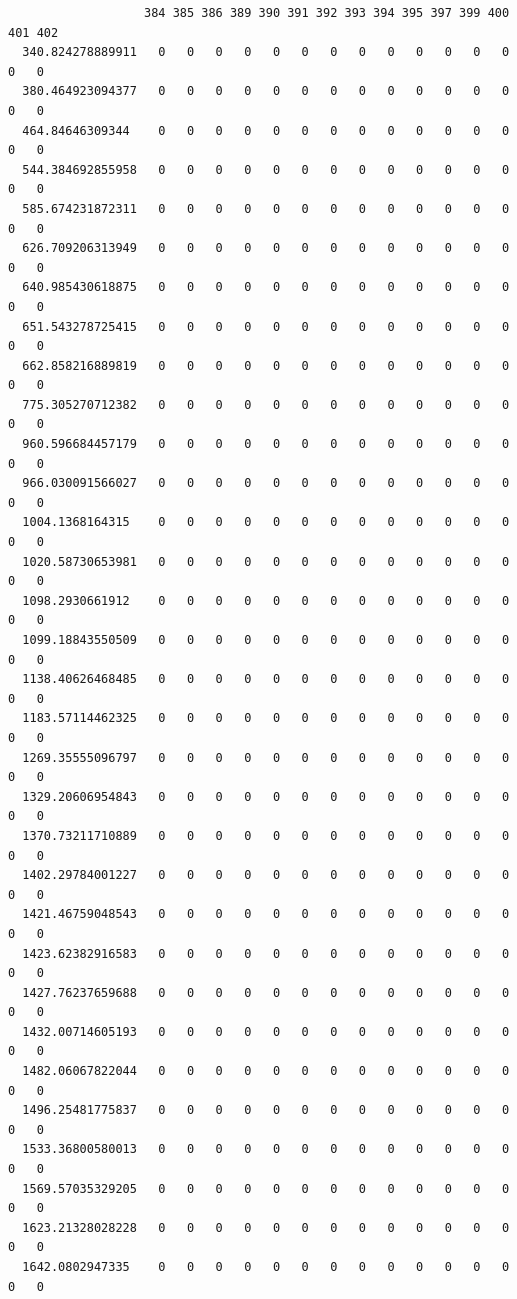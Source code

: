 \documentclass[
  letterpaper,
  DIV=11,
  numbers=noendperiod]{scrartcl}
\begin{document}
\begin{verbatim}
                   384 385 386 389 390 391 392 393 394 395 397 399 400 401 402
  340.824278889911   0   0   0   0   0   0   0   0   0   0   0   0   0   0   0
  380.464923094377   0   0   0   0   0   0   0   0   0   0   0   0   0   0   0
  464.84646309344    0   0   0   0   0   0   0   0   0   0   0   0   0   0   0
  544.384692855958   0   0   0   0   0   0   0   0   0   0   0   0   0   0   0
  585.674231872311   0   0   0   0   0   0   0   0   0   0   0   0   0   0   0
  626.709206313949   0   0   0   0   0   0   0   0   0   0   0   0   0   0   0
  640.985430618875   0   0   0   0   0   0   0   0   0   0   0   0   0   0   0
  651.543278725415   0   0   0   0   0   0   0   0   0   0   0   0   0   0   0
  662.858216889819   0   0   0   0   0   0   0   0   0   0   0   0   0   0   0
  775.305270712382   0   0   0   0   0   0   0   0   0   0   0   0   0   0   0
  960.596684457179   0   0   0   0   0   0   0   0   0   0   0   0   0   0   0
  966.030091566027   0   0   0   0   0   0   0   0   0   0   0   0   0   0   0
  1004.1368164315    0   0   0   0   0   0   0   0   0   0   0   0   0   0   0
  1020.58730653981   0   0   0   0   0   0   0   0   0   0   0   0   0   0   0
  1098.2930661912    0   0   0   0   0   0   0   0   0   0   0   0   0   0   0
  1099.18843550509   0   0   0   0   0   0   0   0   0   0   0   0   0   0   0
  1138.40626468485   0   0   0   0   0   0   0   0   0   0   0   0   0   0   0
  1183.57114462325   0   0   0   0   0   0   0   0   0   0   0   0   0   0   0
  1269.35555096797   0   0   0   0   0   0   0   0   0   0   0   0   0   0   0
  1329.20606954843   0   0   0   0   0   0   0   0   0   0   0   0   0   0   0
  1370.73211710889   0   0   0   0   0   0   0   0   0   0   0   0   0   0   0
  1402.29784001227   0   0   0   0   0   0   0   0   0   0   0   0   0   0   0
  1421.46759048543   0   0   0   0   0   0   0   0   0   0   0   0   0   0   0
  1423.62382916583   0   0   0   0   0   0   0   0   0   0   0   0   0   0   0
  1427.76237659688   0   0   0   0   0   0   0   0   0   0   0   0   0   0   0
  1432.00714605193   0   0   0   0   0   0   0   0   0   0   0   0   0   0   0
  1482.06067822044   0   0   0   0   0   0   0   0   0   0   0   0   0   0   0
  1496.25481775837   0   0   0   0   0   0   0   0   0   0   0   0   0   0   0
  1533.36800580013   0   0   0   0   0   0   0   0   0   0   0   0   0   0   0
  1569.57035329205   0   0   0   0   0   0   0   0   0   0   0   0   0   0   0
  1623.21328028228   0   0   0   0   0   0   0   0   0   0   0   0   0   0   0
  1642.0802947335    0   0   0   0   0   0   0   0   0   0   0   0   0   0   0

\end{verbatim}
\end{document}
